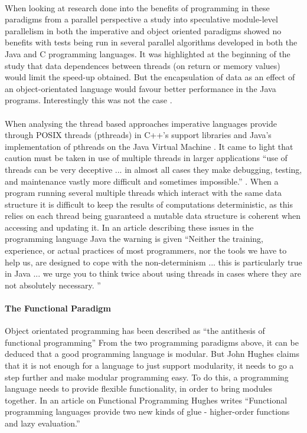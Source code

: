 \documentclass[main.tex]{subfiles}
\begin{document}
\paragraph{}When looking at research done into the benefits of programming in these paradigms from a parallel perspective a study into speculative module-level parallelism in both the imperative and object oriented paradigms showed no benefits with tests being run in several parallel algorithms developed in both the Java and C programming languages. It was highlighted at the beginning of the study that data dependences between threads (on return or memory values) would limit the speed-up obtained. But the encapsulation of data as an effect of an object-orientated language would favour better performance in the Java programs. Interestingly this was not the case \cite{Warg2001}.

\paragraph{}When analysing the thread based approaches imperative languages provide through POSIX threads (pthreads) in C++'s support libraries\cite{Hughes2003} and Java's implementation of pthreads on the Java Virtual Machine \cite{Muller1998}. It came to light that caution must be taken in use of multiple threads in larger applications ``use of threads can be very deceptive ... in almost all cases they make debugging, testing, and maintenance vastly more difficult and sometimes impossible.'' \cite{Muller1998}. When a program running several multiple threads which interact with the same data structure it is difficult to keep the results of computations deterministic, as this relies on each thread being guaranteed a mutable data structure is coherent when accessing and updating it. In an article describing these issues in the programming language Java the warning is given ``Neither the training, experience, or actual practices of most programmers, nor the tools we have to help us, are designed to cope with the non-determinism ... this is particularly true in Java ... we urge you to think twice about using threads in cases where they are not absolutely necessary. \cite{Muller1998}'' 

\paragraph{The Functional Paradigm} Object orientated programming has been described as ``the antithesis of functional programming'' \cite{Taivalsaari1993} From the two programming paradigms above, it can be deduced that a good programming language is modular. But John Hughes claims that it is not enough for a language to just support modularity, it needs to go a step further and make modular programming easy. To do this, a programming language needs to provide flexible functionality, in order to bring modules together. In an article on Functional Programming Hughes writes ``Functional programming languages provide two new kinds of glue - higher-order functions and lazy evaluation.''\cite{Hughes1984}
\end{document}
